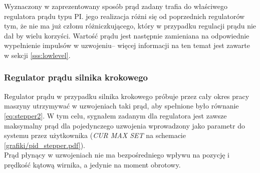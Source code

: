 Wyznaczony w zaprezentowany sposób prąd zadany trafia do właściwego regulatora prądu typu PI. jego realizacja różni się od poprzednich regulatorów tym, że nie ma już członu różniczkującego, który w przypadku regulacji prądu nie dał by wielu korzyści. Wartość prądu jest następnie zamieniana na odpowiednie wypełnienie impulsów w uzwojeniu-- więcej informacji na ten temat jest zawarte w sekcji \ref{sss:lowlevel}.

\subsubsection{Regulator prądu silnika krokowego}

Regulator prądu w przypadku silnika krokowego próbuje przez cały okres pracy maszyny utrzymywać w uzwojeniach taki prąd, aby spełnione było równanie \ref{eq:stepper2}. W tym celu, sygnałem zadanym dla regulatora jest zawsze maksymalny prąd dla pojedynczego uzwojenia wprowadzony jako parametr do systemu przez użytkownika ({\it CUR MAX SET} na schemacie \ref{grafiki/pid_stepper.pdf}). \\

Prąd płynący w uzwojeniach nie ma bezpośredniego wpływu na pozycję i prędkość kątową wirnika, a jedynie na moment obrotowy.















\clearpage